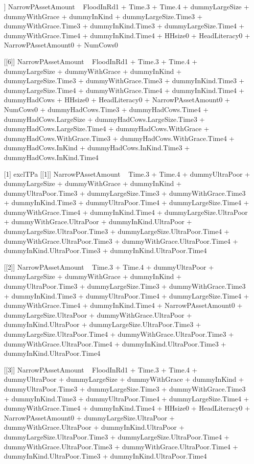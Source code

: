 \begin{Schunk}
\begin{Soutput}
[[5]]
NarrowPAssetAmount ~ FloodInRd1 + Time.3 + Time.4 + dummyLargeSize + 
    dummyWithGrace + dummyInKind + dummyLargeSize.Time3 + dummyWithGrace.Time3 + 
    dummyInKind.Time3 + dummyLargeSize.Time4 + dummyWithGrace.Time4 + 
    dummyInKind.Time4 + HHsize0 + HeadLiteracy0 + NarrowPAssetAmount0 + 
    NumCows0

[[6]]
NarrowPAssetAmount ~ FloodInRd1 + Time.3 + Time.4 + dummyLargeSize + 
    dummyWithGrace + dummyInKind + dummyLargeSize.Time3 + dummyWithGrace.Time3 + 
    dummyInKind.Time3 + dummyLargeSize.Time4 + dummyWithGrace.Time4 + 
    dummyInKind.Time4 + dummyHadCows + HHsize0 + HeadLiteracy0 + 
    NarrowPAssetAmount0 + NumCows0 + dummyHadCows.Time3 + dummyHadCows.Time4 + 
    dummyHadCows.LargeSize + dummyHadCows.LargeSize.Time3 + dummyHadCows.LargeSize.Time4 + 
    dummyHadCows.WithGrace + dummyHadCows.WithGrace.Time3 + dummyHadCows.WithGrace.Time4 + 
    dummyHadCows.InKind + dummyHadCows.InKind.Time3 + dummyHadCows.InKind.Time4

[1] exclTPa
[[1]]
NarrowPAssetAmount ~ Time.3 + Time.4 + dummyUltraPoor + dummyLargeSize + 
    dummyWithGrace + dummyInKind + dummyUltraPoor.Time3 + dummyLargeSize.Time3 + 
    dummyWithGrace.Time3 + dummyInKind.Time3 + dummyUltraPoor.Time4 + 
    dummyLargeSize.Time4 + dummyWithGrace.Time4 + dummyInKind.Time4 + 
    dummyLargeSize.UltraPoor + dummyWithGrace.UltraPoor + dummyInKind.UltraPoor + 
    dummyLargeSize.UltraPoor.Time3 + dummyLargeSize.UltraPoor.Time4 + 
    dummyWithGrace.UltraPoor.Time3 + dummyWithGrace.UltraPoor.Time4 + 
    dummyInKind.UltraPoor.Time3 + dummyInKind.UltraPoor.Time4

[[2]]
NarrowPAssetAmount ~ Time.3 + Time.4 + dummyUltraPoor + dummyLargeSize + 
    dummyWithGrace + dummyInKind + dummyUltraPoor.Time3 + dummyLargeSize.Time3 + 
    dummyWithGrace.Time3 + dummyInKind.Time3 + dummyUltraPoor.Time4 + 
    dummyLargeSize.Time4 + dummyWithGrace.Time4 + dummyInKind.Time4 + 
    NarrowPAssetAmount0 + dummyLargeSize.UltraPoor + dummyWithGrace.UltraPoor + 
    dummyInKind.UltraPoor + dummyLargeSize.UltraPoor.Time3 + 
    dummyLargeSize.UltraPoor.Time4 + dummyWithGrace.UltraPoor.Time3 + 
    dummyWithGrace.UltraPoor.Time4 + dummyInKind.UltraPoor.Time3 + 
    dummyInKind.UltraPoor.Time4

[[3]]
NarrowPAssetAmount ~ FloodInRd1 + Time.3 + Time.4 + dummyUltraPoor + 
    dummyLargeSize + dummyWithGrace + dummyInKind + dummyUltraPoor.Time3 + 
    dummyLargeSize.Time3 + dummyWithGrace.Time3 + dummyInKind.Time3 + 
    dummyUltraPoor.Time4 + dummyLargeSize.Time4 + dummyWithGrace.Time4 + 
    dummyInKind.Time4 + HHsize0 + HeadLiteracy0 + NarrowPAssetAmount0 + 
    dummyLargeSize.UltraPoor + dummyWithGrace.UltraPoor + dummyInKind.UltraPoor + 
    dummyLargeSize.UltraPoor.Time3 + dummyLargeSize.UltraPoor.Time4 + 
    dummyWithGrace.UltraPoor.Time3 + dummyWithGrace.UltraPoor.Time4 + 
    dummyInKind.UltraPoor.Time3 + dummyInKind.UltraPoor.Time4


\end{Soutput}
\end{Schunk}
